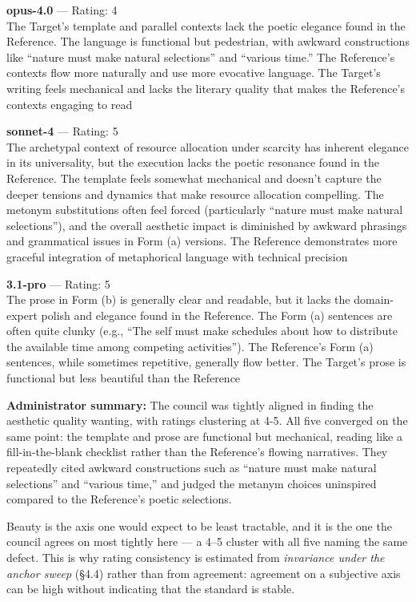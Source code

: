 \textbf{opus-4.0} --- Rating: 4\\
The Target's template and parallel contexts lack the poetic elegance found in the Reference. The language is functional but pedestrian, with awkward constructions like ``nature must make natural selections'' and ``various time.'' The Reference's contexts flow more naturally and use more evocative language. The Target's writing feels mechanical and lacks the literary quality that makes the Reference's contexts engaging to read

\textbf{sonnet-4} --- Rating: 5\\
The archetypal context of resource allocation under scarcity has inherent elegance in its universality, but the execution lacks the poetic resonance found in the Reference. The template feels somewhat mechanical and doesn't capture the deeper tensions and dynamics that make resource allocation compelling. The metonym substitutions often feel forced (particularly ``nature must make natural selections''), and the overall aesthetic impact is diminished by awkward phrasings and grammatical issues in Form (a) versions. The Reference demonstrates more graceful integration of metaphorical language with technical precision

\textbf{3.1-pro} --- Rating: 5\\
The prose in Form (b) is generally clear and readable, but it lacks the domain-expert polish and elegance found in the Reference. The Form (a) sentences are often quite clunky (e.g., ``The self must make schedules about how to distribute the available time among competing activities''). The Reference's Form (a) sentences, while sometimes repetitive, generally flow better. The Target's prose is functional but less beautiful than the Reference

\textbf{Administrator summary:} The council was tightly aligned in finding the aesthetic quality wanting, with ratings clustering at 4-5. All five converged on the same point: the template and prose are functional but mechanical, reading like a fill-in-the-blank checklist rather than the Reference's flowing narratives. They repeatedly cited awkward constructions such as ``nature must make natural selections'' and ``various time,'' and judged the metanym choices uninspired compared to the Reference's poetic selections.

Beauty is the axis one would expect to be least tractable, and it is the one the council agrees on most tightly here --- a 4--5 cluster with all five naming the same defect. This is why rating consistency is estimated from \emph{invariance under the anchor sweep} (§4.4) rather than from agreement: agreement on a subjective axis can be high without indicating that the standard is stable.

